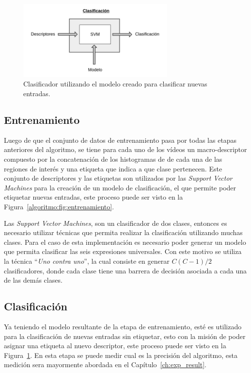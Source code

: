 	\begin{figure}[bt]
		\centering
    		\includegraphics[width=0.7\textwidth]{Figuras/Diagramas/Clasificacion.png}
  		\caption{Clasificador utilizando el modelo creado para clasificar nuevas entradas.}
  		\label{algoritmo:fig:clasificacion}
	\end{figure}	
		
	


	\subsection{Entrenamiento}
	\label{algoritmo:entrenamiento}
		Luego de que el conjunto de datos de entrenamiento pasa por todas las etapas anteriores del algoritmo, se tiene para cada uno de los vídeos un macro-descriptor compuesto por la concatenación de los histogramas de de cada una de las regiones de interés y una etiqueta que indica a que clase pertenecen. Este conjunto de descriptores y las etiquetas son utilizados por las \textit{Support Vector Machines} para la creación de un modelo de clasificación, el que permite poder etiquetar nuevas entradas, este proceso puede ser visto en la Figura~\ref{algoritmo:fig:entrenamiento}.
	
	Las \textit{Support Vector Machines}, son un clasificador de dos clases, entonces es necesario utilizar técnicas que permita realizar la clasificación utilizando muchas clases. Para el caso de esta implementación es necesario poder generar un modelo que permita clasificar las seis expresiones universales. Con este motivo se utiliza la técnica ``\textit{Uno contra uno}'', la cual consiste en generar $C(C-1)/2$ clasificadores, donde cada clase tiene una barrera de decisión asociada a cada una de las demás clases.
			
		
	\subsection{Clasificación}
	\label{algoritmo:clasificacion}
		Ya teniendo el modelo resultante de la etapa de entrenamiento, esté es utilizado para la clasificación de nuevas entradas sin etiquetar, esto con la misión de poder asignar una etiqueta al nuevo descriptor, este proceso puede ser visto en la Figura~\ref{algoritmo:fig:clasificacion}. En esta etapa se puede medir cual es la precisión del algoritmo, esta medición sera mayormente abordada en el Capítulo~\ref{ch:exp_result}.
		
	
	
	
	
	